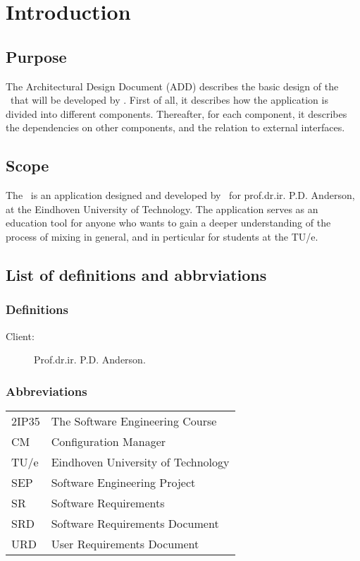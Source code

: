 \chapter{Introduction}

\section{Purpose}
The Architectural Design Document (ADD) describes the basic design of the \applicationname\ that will be developed by \projectauthor. First of all, it describes how the application is divided into different components. Thereafter, for each component, it describes the dependencies on other components, and the relation to external interfaces.

\section{Scope}
The \applicationname\ is an application designed and developed by \projectauthor\ for prof.dr.ir. P.D. Anderson, at the Eindhoven University of Technology. The application serves as an education tool for anyone who wants to gain a deeper understanding of the process of mixing in general, and in perticular for students at the TU/e.

\section{List of definitions and abbrviations}
\subsection{Definitions}
\begin{description}
\item[Client:] Prof.dr.ir. P.D. Anderson.
\end{description}

\subsection{Abbreviations}
\begin{tabular}{l|l}
2IP35 & The Software Engineering Course \\
CM    &Configuration Manager \\
TU/e  &Eindhoven University of Technology \\
SEP   &Software Engineering Project \\
SR    &Software Requirements \\
SRD & Software Requirements Document \\
URD   &User Requirements Document \\
\end{tabular}
\\

